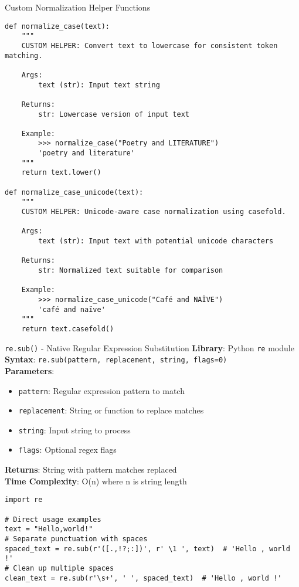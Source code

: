 \documentclass[11pt,a4paper]{article}
\begin{document}
\begin{custombox}{Custom Normalization Helper Functions}

\begin{lstlisting}[caption=Custom case normalization helpers]
def normalize_case(text):
    """
    CUSTOM HELPER: Convert text to lowercase for consistent token matching.
    
    Args:
        text (str): Input text string
        
    Returns:
        str: Lowercase version of input text
        
    Example:
        >>> normalize_case("Poetry and LITERATURE")
        'poetry and literature'
    """
    return text.lower()

def normalize_case_unicode(text):
    """
    CUSTOM HELPER: Unicode-aware case normalization using casefold.
    
    Args:
        text (str): Input text with potential unicode characters
        
    Returns:
        str: Normalized text suitable for comparison
        
    Example:
        >>> normalize_case_unicode("Café and NAÏVE")
        'café and naïve'
    """
    return text.casefold()
\end{lstlisting}
\end{custombox}

\begin{nativebox}{\texttt{re.sub()} - Native Regular Expression Substitution}
\textbf{Library}: Python \texttt{re} module \\
\textbf{Syntax}: \texttt{re.sub(pattern, replacement, string, flags=0)} \\
\textbf{Parameters}:
\begin{itemize}
\item \texttt{pattern}: Regular expression pattern to match
\item \texttt{replacement}: String or function to replace matches
\item \texttt{string}: Input string to process
\item \texttt{flags}: Optional regex flags
\end{itemize}

\textbf{Returns}: String with pattern matches replaced \\
\textbf{Time Complexity}: O(n) where n is string length

\begin{lstlisting}[caption=Direct regex usage examples]
import re

# Direct usage examples
text = "Hello,world!"
# Separate punctuation with spaces
spaced_text = re.sub(r'([.,!?;:])', r' \1 ', text)  # 'Hello , world !'
# Clean up multiple spaces  
clean_text = re.sub(r'\s+', ' ', spaced_text)  # 'Hello , world !'
\end{lstlisting}
\end{nativebox}
\end{document}
